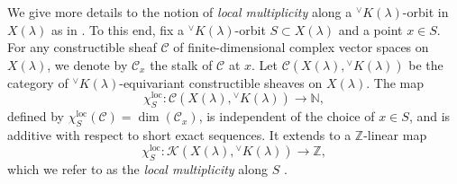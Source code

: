 \documentclass[a4paper, 11pt]{article}
\begin{document}
We give more details to the 
notion of \emph{local multiplicity} along a
${}^{\vee}K(\lambda)$-orbit in \( X(\lambda) \)  as in
\cite[Definition 23.6]{ABV}.    
To this end, fix a ${}^{\vee}K(\lambda)$-orbit \( S \subset X(\lambda)
\) and a point \( x \in S \).  For any constructible sheaf \( \mathcal{C} \) of
finite-dimensional complex vector spaces on \( X(\lambda) \),
we denote by \( \mathcal{C}_x \) the stalk of \( \mathcal{C} \) at \(
x \). 
Let $\mathcal{C}(X(\lambda),{}^{\vee}K(\lambda))$ be the category of
${}^{\vee}K(\lambda)$-equivariant constructible sheaves on
$X(\lambda)$. The map  
\[
\chi_{S}^{\mathrm{loc}} : \mathcal{C}(X(\lambda),{}^{\vee}K(\lambda))
\longrightarrow 
\mathbb{N},
\] 
defined by $\chi_{S}^{\mathrm{loc}}( \mathcal{C}) = \dim(\mathcal{C}_x)$,
is independent of the choice of $x \in S$, and is additive with respect
to short exact sequences.  It extends to a $\mathbb{Z}$-linear map
$$\chi_{S}^{\mathrm{loc}} : \mathscr{K}(X(\lambda),{}^{\vee}K(\lambda))
\longrightarrow \mathbb{Z},$$
which we refer to as the \emph{local multiplicity} along $S$
\cite[Definition 1.28, Lemma 7.8]{ABV}. 
\end{document}
